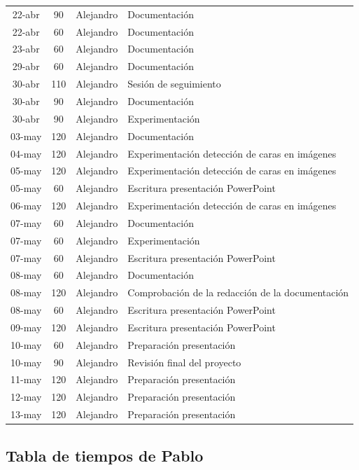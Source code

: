 \documentclass[a4paper]{article}
\begin{document}
\begin{center}
\begin{longtable}{|c|c|c|p{8cm}|}
22-abr & 90  & Alejandro & Documentación \\
22-abr & 60  & Alejandro & Documentación \\
23-abr & 60  & Alejandro & Documentación \\
29-abr & 60  & Alejandro & Documentación \\
30-abr & 110 & Alejandro & Sesión de seguimiento \\
30-abr & 90  & Alejandro & Documentación \\
30-abr & 90  & Alejandro & Experimentación \\
03-may & 120 & Alejandro & Documentación \\
04-may & 120 & Alejandro & Experimentación detección de caras en imágenes \\
05-may & 120 & Alejandro & Experimentación detección de caras en imágenes \\
05-may & 60  & Alejandro & Escritura presentación PowerPoint \\
06-may & 120 & Alejandro & Experimentación detección de caras en imágenes \\
07-may & 60  & Alejandro & Documentación \\
07-may & 60  & Alejandro & Experimentación \\
07-may & 60  & Alejandro & Escritura presentación PowerPoint \\
08-may & 60  & Alejandro & Documentación \\
08-may & 120 & Alejandro & Comprobación de la redacción de la documentación \\
08-may & 60  & Alejandro & Escritura presentación PowerPoint \\
09-may & 120 & Alejandro & Escritura presentación PowerPoint \\
10-may & 60  & Alejandro & Preparación presentación \\
10-may & 90  & Alejandro & Revisión final del proyecto \\
11-may & 120 & Alejandro & Preparación presentación \\
12-may & 120 & Alejandro & Preparación presentación \\
13-may & 120 & Alejandro & Preparación presentación \\
\hline
\end{longtable}
\end{center}

\subsection{Tabla de tiempos de Pablo}
\end{document}
